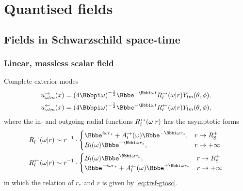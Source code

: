 \section{Quantised fields}
\label{sec:quantised}

\subsection{Fields in Schwarzschild space-time}

\subsubsection{Linear, massless scalar field}

\cite{PhysRevD.21.2185}

\begin{nameddef}{Complete exterior modes}
\begin{align}
\rfun{u_{\omega lm}^{\rightarrow}}{x} &= \rbr{4\pp\omega}^{-\frac{1}{2}}
\ee^{-\ii\omega t} \rfun{R_l^{\rightarrow}}{\omega\middle| r}
\rfun{Y_{lm}}{\theta, \phi}, \\
\rfun{u_{\omega lm}^{\leftarrow}}{x} &= \rbr{4\pp\omega}^{-\frac{1}{2}}
\ee^{-\ii\omega t} \rfun{R_l^{\leftarrow}}{\omega\middle| r}
\rfun{Y_{lm}}{\theta, \phi}, 
\end{align}
where the in- and outgoing radial functions
${R_l^{\leftrightarrow}}\mathopen{}\left(\omega\middle| r\right)\mathclose{}$ has the asymptotic forms
\begin{align}
\rfun{R_l^{\rightarrow}}{\omega\middle| r} &\sim r^{-1} \cdot
\begin{cases}
\ee^{i\omega r_*}
+ \rfun{A_l^\rightarrow}{\omega}\ee^{-\ii\omega r_*}, & r\to \rSch^+ \\
\rfun{B_l}{\omega}\ee^{+\ii\omega r_*}, & r\to +\infty
\end{cases}
\\
\rfun{R_l^{\leftarrow}}{\omega\middle| r} &\sim r^{-1} \cdot
\begin{cases}
\rfun{B_l}{\omega}\ee^{\ii\omega r_*}, & r\to \rSch^+ \\
\ee^{-i\omega r_*}
+ \rfun{A_l^\leftarrow}{\omega}\ee^{+\ii\omega r_*} & r\to +\infty
\end{cases}
\end{align}
in which the relation of $r_*$ and $r$ is given by \cref{eq:trsf-gtosc}.
\end{nameddef}

